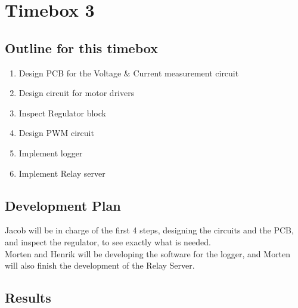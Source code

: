 \documentclass[12pt,a4paper]{report}
\begin{document}
\section{Timebox 3}
\subsection{Outline for this timebox}

\begin{enumerate}
\item Design PCB for the Voltage \& Current measurement circuit
\item Design circuit for motor drivers
\item Inspect Regulator block
\item Design PWM circuit

\item Implement logger
\item Implement Relay server
\end{enumerate}


\subsection{Development Plan}
Jacob will be in charge of the first 4 steps, designing the circuits and the PCB, and inspect the regulator, to see exactly what is needed.\\
Morten and Henrik will be developing the software for the logger, and Morten will also finish the development of the Relay Server. 

\subsection{Results}









\end{document}
